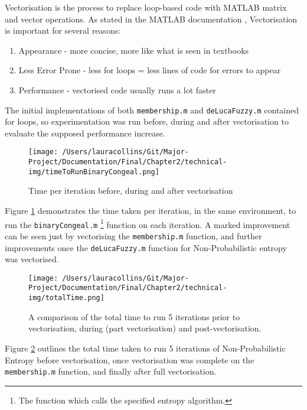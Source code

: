 Vectorisation is the process to replace loop-based code with MATLAB matrix and vector operations. As stated in the MATLAB documentation \cite{vectorisation}, Vectorisation is important for several reasons:

\begin{enumerate}
    \item Appearance - more concise, more like what is seen in textbooks
    \item Less Error Prone - less for loops = less lines of code for errors to appear
    \item Performance - vectorised code usually runs a lot faster
\end{enumerate}

The initial implementations of both \texttt{membership.m} and \texttt{deLucaFuzzy.m} contained for loops, so experimentation was run before, during and after vectorisation to evaluate the supposed performance increase.

\begin{figure}[H]
  \centering
  \texttt{[image: /Users/lauracollins/Git/Major-Project/Documentation/Final/Chapter2/technical-img/timeToRunBinaryCongeal.png]}
  \caption{Time per iteration before, during and after vectorisation}
  \label{fig:time-per-iteration}
\end{figure}

Figure \ref{fig:time-per-iteration} demonstrates the time taken per iteration, in the same environment, to run the \texttt{binaryCongeal.m} \footnote{The function which calls the specified entropy algorithm.} function on each iteration. A marked improvement can be seen just by vectorising the \texttt{membership.m} function, and further improvements once the \texttt{deLucaFuzzy.m} function for Non-Probabilistic entropy was vectorised.

\begin{figure}[H]
  \centering
  \texttt{[image: /Users/lauracollins/Git/Major-Project/Documentation/Final/Chapter2/technical-img/totalTime.png]}
  \caption{A comparison of the total time to run 5 iterations prior to vectorisation, during (part vectorisation) and post-vectorisation.}
  \label{fig:total-time}
\end{figure}

Figure \ref{fig:total-time} outlines the total time taken to run 5 iterations of Non-Probabilistic Entropy before vectorisation, once vectorisation was complete on the \texttt{membership.m} function, and finally after full vectorisation.
